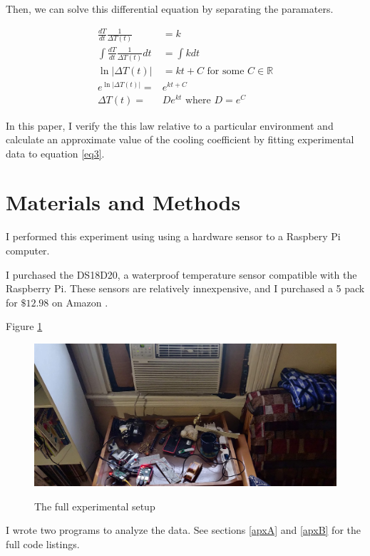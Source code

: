 \documentclass[12pt]{article}
\newcommand{\reals}{\mathbb{R}}
\begin{document}
Then, we can solve this differential equation by separating the paramaters.

\begin{align} \label{eq2}
	\frac{dT}{dt}\frac{1}{\Delta T(t)} & = k \\
	\int \frac{dT}{dt}\frac{1}{\Delta T(t)} dt & = \int k dt \\
	\ln|\Delta T(t)| & = kt + C \textrm{ for some $C \in \reals$} \\
	e^{\ln | \Delta T(t) | } = & e^{kt + C} \\
	\label{eq3}
	\Delta T(t) = & De^{kt} \textrm{ where $D = e^C$ }
\end{align}

In this paper, I verify the this law
relative to a particular environment
and calculate an approximate value of the cooling coefficient
by fitting experimental data to equation \ref{eq3}.

\section{Materials and Methods}

I performed this experiment using
using a hardware sensor
to a Raspbery Pi computer.

I purchased the DS18D20,
a waterproof temperature sensor compatible with the Raspberry Pi.
These sensors are relatively innexpensive,
and I purchased a 5 pack for $\$12.98$ on Amazon \citep{Amazon}.



Figure \ref{fig2} 

\begin{figure}
	\includegraphics[scale=0.1]{full_setup.jpg}
	\centering
	\label{fig2}
	\caption{The full experimental setup}
\end{figure}

I wrote two programs to analyze the data.
See sections \ref{apxA} and \ref{apxB} for the full code listings.
\end{document}
